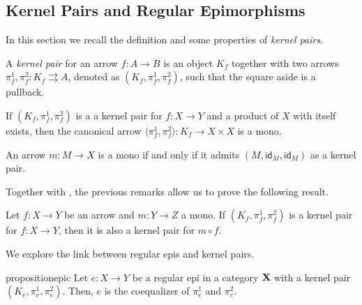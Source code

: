 \documentclass[a4paper,UKenglish,cleveref,pdftex,thm-restate,numberwithinsect]{lipics-v2021}
\def\X{\textbf {\textup{X}}}
\newcommand{\id}[1]{\mathsf{id}_{#1}}
\begin{document}
\subsection{Kernel Pairs and Regular Epimorphisms}

In this section we recall the definition and some properties of \emph{kernel pairs}.

\noindent 
\parbox{11cm}{
\begin{definition}
    A \emph{kernel pair} for an arrow $f\colon A \to B$ is an object $K_f$ together with two arrows $\pi^1_f, \pi^2_f\colon K_f \rightrightarrows A$, denoted as $(K_f, \pi^1_f, \pi^2_f)$, such that the square aside is a pullback.
\end{definition}}\hfill 
\parbox{2cm}{}

\smallskip
\begin{remark}\label{prop:pairng_of_kernel_pairs_mono}
If $(K_f, \pi^1_f, \pi^2_f)$ is a a kernel pair for $f\colon X \to Y$ and a product of $X$ with itself exists, then the canonical arrow $\langle \pi^1_f, \pi^2_f\rangle \colon K_f \to X \times X$ is a mono.
\end{remark}

\begin{remark}\label{prop:kermono}
An arrow $m\colon M\to X$ is a mono if and only if it admits $(M, \id{M}, \id{M})$ as a kernel pair.
\end{remark}

Together with , the previous remarks allow us to prove the following result.

\begin{proposition}\label{cor:kermono}
	Let $f\colon X\to Y$ be an arrow and $m\colon Y\to Z$ a mono. If
	$(K_f, \pi_f^1, \pi_f^2)$ is a kernel pair for $f\colon X\to Y$, then it is also a kernel pair for $m\circ f$.
\end{proposition}

We explore the link between regular epis and kernel pairs.

\begin{restatable}{proposition}{epic}\label{prop:reg_epi_coeq}
    Let $e\colon X \to Y$ be a regular epi in a category $\X$ with a kernel pair $(K_e, \pi^1_e, \pi^2_e)$. Then, $e$ is the coequalizer of $\pi^1_e$ and $\pi^2_e$.
\end{restatable}
\end{document}
